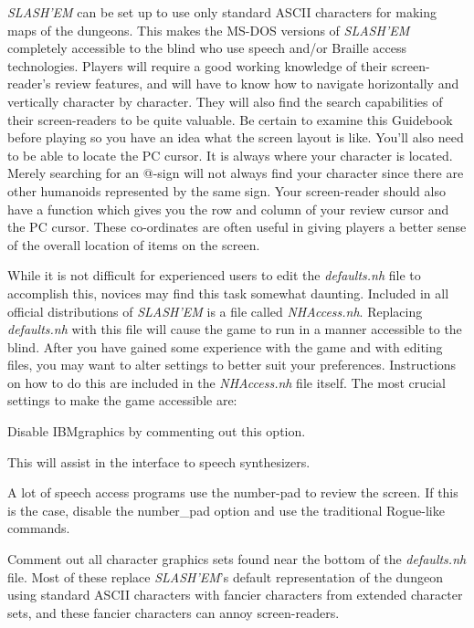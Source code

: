 {\it SLASH'EM\/} can be set up to use only standard ASCII characters for making
maps of the dungeons. This makes the MS-DOS versions of {\it SLASH'EM\/} completely
accessible to the blind who use speech and/or Braille access technologies.
Players will require a good working knowledge of their screen-reader's
review features, and will have to know how to navigate horizontally and
vertically character by character. They will also find the search
capabilities of their screen-readers to be quite valuable. Be certain to
examine this Guidebook before playing so you have an idea what the screen
layout is like. You'll also need to be able to locate the PC cursor. It is
always where your character is located. Merely searching for an @-sign will
not always find your character since there are other humanoids represented
by the same sign. Your screen-reader should also have a function which
gives you the row and column of your review cursor and the PC cursor.
These co-ordinates are often useful in giving players a better sense of the
overall location of items on the screen.

While it is not difficult for experienced users to edit the {\it defaults.nh\/}
file to accomplish this, novices may find this task somewhat daunting.
Included in all official distributions of {\it SLASH'EM\/} is a file called
{\it NHAccess.nh}.  Replacing {\it defaults.nh\/} with this file will cause
the game to run in a manner accessible to the blind. After you have gained
some experience with the game and with editing files, you may want to alter
settings to better suit your preferences. Instructions on how to do this
are included in the {\it NHAccess.nh\/} file itself. The most crucial settings to
make the game accessible are:

\blist{}

\item[\ib{IBMgraphics}]
Disable IBMgraphics by commenting out this option.

\item[\ib{menustyle:traditional}]
This will assist in the interface to speech synthesizers.

\item[\ib{number\_pad}]
A lot of speech access programs use the number-pad to review the screen.
If this is the case, disable the number\_pad option and use the traditional
Rogue-like commands.

\item[\ib{Character graphics}]
Comment out all character graphics sets found near the bottom of the
{\it defaults.nh\/} file.  Most of these replace {\it {\it SLASH'EM\/}\/}'s
default representation of the dungeon using standard ASCII characters
with fancier characters from extended character sets, and these fancier
characters can annoy screen-readers.
\elist
\nd %
